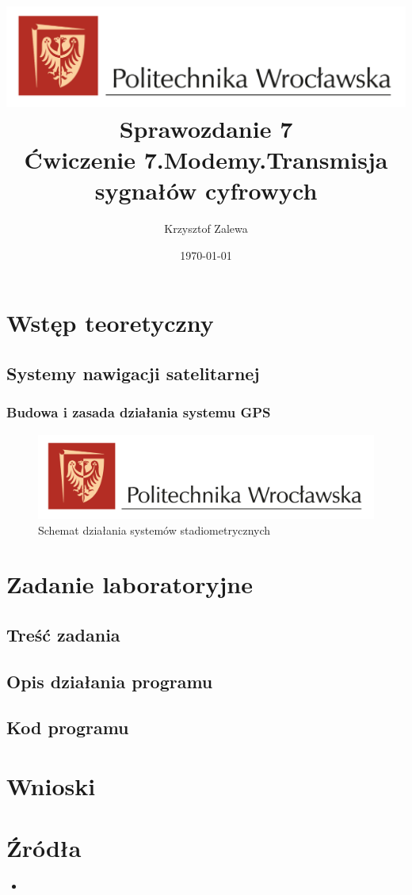 \documentclass{article}
\title{
  \centering
  \includegraphics[width=\textwidth]{src/images/logo_PWr_kolor_poziom.png}\\
  \fontsize{28pt}{30pt}\selectfont Sprawozdanie 7\\
  \fontsize{14pt}{30pt}\selectfont Ćwiczenie 7.Modemy.Transmisja sygnałów cyfrowych}
\author{Krzysztof Zalewa}
\date{\daymonthyear\today}
\begin{document}
  \maketitle
  \pagebreak
  \tableofcontents
  \pagebreak
  \section{Wstęp teoretyczny}
    \subsection{Systemy nawigacji satelitarnej}
    \subsubsection{Budowa i zasada działania systemu GPS}
    \begin{figure}[ht]
      \centering
      \includegraphics[width=\textwidth]{src/images/logo_PWr_kolor_poziom.png}
      \caption{Schemat działania systemów stadiometrycznych}
      \label{fig:gps}
    \end{figure}
    
  \raggedright
  \section{Zadanie laboratoryjne}
    \subsection{Treść zadania}
    
    \subsection{Opis działania programu}
    
    \subsection{Kod programu}
  \section{Wnioski}

  \section{Źródła}
  \begin{itemize}
    \item 
  \end{itemize}
\end{document}
